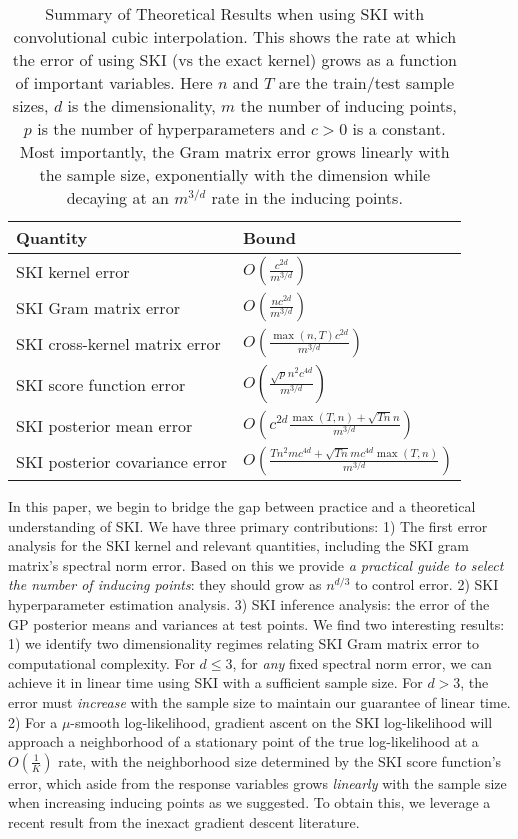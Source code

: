 \begin{table*}[h]
\centering
\begin{tabular}{|l|l|}
\hline
\textbf{Quantity} & \textbf{Bound} \\
\hline
SKI kernel error & $O(\frac{c^{2d}}{m^{3/d}})$ \\
\hline
SKI Gram matrix error & $O(\frac{nc^{2d}}{m^{3/d}})$ \\
\hline
SKI cross-kernel matrix error & $O(\frac{\max(n,T)c^{2d}}{m^{3/d}})$ \\
\hline
SKI score function error & $O(\frac{\sqrt{p}n^{2}c^{4d}}{m^{3/d}})$ \\
\hline
SKI posterior mean error & $O(c^{2d}\frac{\max(T,n)+\sqrt{Tn}n}{m^{3/d}})$ \\
\hline
SKI posterior covariance error & $O(\frac{Tn^{2}mc^{4d}+\sqrt{Tn}mc^{4d}\max(T,n)}{m^{3/d}})$ \\
\hline
\end{tabular}
\caption{Summary of Theoretical Results when using SKI with convolutional cubic interpolation. This shows the rate at which the error of using SKI (vs the exact kernel) grows as a function of important variables. Here $n$ and $T$ are the train/test sample sizes, $d$ is the dimensionality, $m$ the number of inducing points, $p$ is the number of hyperparameters and $c>0$ is a constant. Most importantly, the Gram matrix error grows linearly with the sample size, exponentially with the dimension while decaying at an $m^{3/d}$ rate in the inducing points.}
\label{table:theoretical_results}
\end{table*}

In this paper, we begin to bridge the gap between practice and a theoretical understanding of SKI. We have three primary contributions: 1) The first error analysis for the SKI kernel and relevant quantities, including the SKI gram matrix's spectral norm error. Based on this we provide \textit{a practical guide to select the number of inducing points}: they should grow as $n^{d/3}$ to control error. 2) SKI hyperparameter estimation analysis. 3) SKI inference analysis: the error of the GP posterior means and variances at test points. We find two interesting results: 1) we identify two dimensionality regimes relating SKI Gram matrix error to computational complexity. For $d\leq 3$, for \textit{any} fixed spectral norm error, we can achieve it in linear time using SKI with a sufficient sample size. For $d>3$, the error must \textit{increase} with the sample size to maintain our guarantee of linear time. 2) For a $\mu$-smooth log-likelihood, gradient ascent on the SKI log-likelihood will approach a neighborhood of a stationary point of the true log-likelihood at a $O\left(\frac{1}{K}\right)$ rate, with the neighborhood size determined by the SKI score function's error, which aside from the response variables grows \textit{linearly} with the sample size when increasing inducing points as we suggested. To obtain this, we leverage a recent result \cite{stonyakin2023stopping} from the inexact gradient descent \cite{daspremont2008smooth,devolder2014first} literature.

